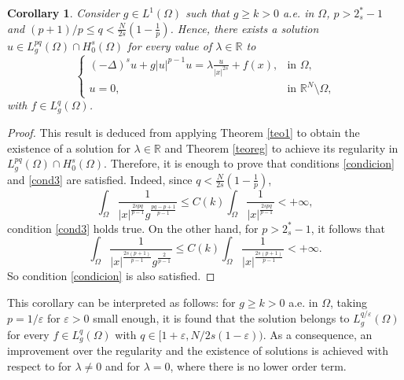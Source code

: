 \documentclass[preprint,12pt]{elsarticle}
\newtheorem{corollary}[theorem]{Corollary}
\begin{document}
		\begin{corollary}\label{problemboundedg}
			Consider $g\in L^1(\Omega)$ such that $g\geq k>0$ a.e. in $\Omega$, $p>2^*_s-1$ and $(p+1)/p\leq q<\frac{N}{2s}(1-\frac{1}{p})$. Hence, there exists a solution ${u\in L_g^{pq}(\Omega)\cap H^s_0(\Omega)}$ for every value of $\lambda\in \mathbb{R}$ to
			\begin{equation*}
				\begin{cases}
					\displaystyle(-\Delta)^s u+ g|u|^{p-1}u=\lambda\frac{u}{|x|^{2s}}+ f(x), &  \text{in $\Omega$,}\\
					u=0, & \text{in $\mathbb{R}^N\setminus\Omega$,}
				\end{cases}
			\end{equation*}	
			with $f\in L_g^q(\Omega)$.\par
		\end{corollary}
		\begin{proof}
			This result is deduced from applying Theorem \ref{teo1} to obtain the existence of a solution for $\lambda\in \mathbb{R}$ and Theorem \ref{teoreg} to achieve its regularity in $L^{pq}_g(\Omega)\cap H^s_0(\Omega)$. Therefore, it is enough to prove that conditions \eqref{condicion} and \eqref{cond3} are satisfied. Indeed, since $q<\frac{N}{2s}(1-\frac{1}{p})$,
			\[\int_{\Omega}\frac{1}{|x|^{\frac{2spq}{p-1}}g^{\frac{pq-p+1}{p-1}}}\leq C(k)\int_{\Omega}\frac{1}{|x|^{\frac{2spq}{p-1}}}<+\infty,\]
			condition \eqref{cond3} holds true. On the other hand, for  $p>2^*_s-1$, it follows that
			\[\int_{\Omega}\frac{1}{|x|^{\frac{2s(p+1)}{p-1}}g^{\frac{2}{p-1}}}\leq C(k)\int_{\Omega}\frac{1}{|x|^{\frac{2s(p+1)}{p-1}}}<+\infty.\]
			So condition \eqref{condicion} is also satisfied.
		\end{proof}
		This corollary can be interpreted as follows: for $g\geq k>0$ a.e. in $\Omega$, taking $p=1/\varepsilon$ for $\varepsilon>0$ small enough, it is found that the solution belongs to $L_g^{q/\varepsilon}(\Omega)$ for every $f\in L_g^q(\Omega)$ with $q\in [1+\varepsilon, N/2s(1-\varepsilon))$. As a consequence, an improvement over the regularity and the existence of solutions is achieved with respect to \cite[Theorem 4.2, Theorem 4.9]{Ireneo} for $\lambda\neq 0$ and  \cite[Theorem 16, Theorem 24]{Leonori} for $\lambda=0$, where there is no lower order term.
		\appendix
\end{document}
